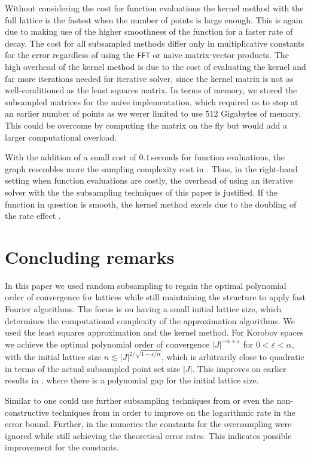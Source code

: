 \documentclass[a4paper]{amsart}
\begin{document}
Without considering the cost for function evaluations the kernel method with the full lattice is the fastest when the number of points is large enough.
This is again due to making use of the higher smoothness of the function for a faster rate of decay.
The cost for all subsampled methods differ only in multiplicative constants for the error regardless of using the \texttt{FFT} or naive matrix-vector products.
The high overhead of the kernel method is due to the cost of evaluating the kernel and far more iterations needed for iterative solver, since the kernel matrix is not as well-conditioned as the least squares matrix.
In terms of memory, we stored the subsampled matrices for the naive implementation, which required us to stop at an earlier number of points as we werer limited to use $512$ Gigabytes of memory.
This could be overcome by computing the matrix on the fly but would add a larger computational overload.

With the addition of a small cost of $0.1$\,seconds for function evaluations, the graph resembles more the sampling complexity cost in .
Thus, in the right-hand setting when function evaluations are costly, the overhead of using an iterative solver with the the subsampling techniques of this paper is justified.
If the function in question is smooth, the kernel method excels due to the doubling of the rate effect \cite{SK25}.
 \section{Concluding remarks}\label{sec:conclusion} 

In this paper we used random subsampling to regain the optimal polynomial order of convergence for lattices while still maintaining the structure to apply fast Fourier algorithms.
The focus is on having a small initial lattice size, which determines the computational complexity of the approximation algorithms. We used the least squares approximation and the kernel method.
For Korobov spaces we achieve the optimal polynomial order of convergence 
$|J|^{-\alpha+\varepsilon}$ for $0<\varepsilon<\alpha$, with the initial lattice size $n\lesssim |J|^{2/\sqrt{1-\varepsilon/\alpha}}$, which is arbitrarily close to quadratic in terms of the actual  subsampled point set size $|J|$.
This improves on earlier results in \cite{BKPU22}, where there is a polynomial gap for the initial lattice size.

Similar to \cite{BKPU22} one could use further subsampling techniques from \cite{BSU23} or even the non-constructive techniques from \cite{DKU23} in order to improve on the logarithmic rate in the error bound.
Further, in the numerics the constants for the oversampling were ignored while still achieving the theoretical error rates.
This indicates possible improvement for the constants.
 
\end{document}
